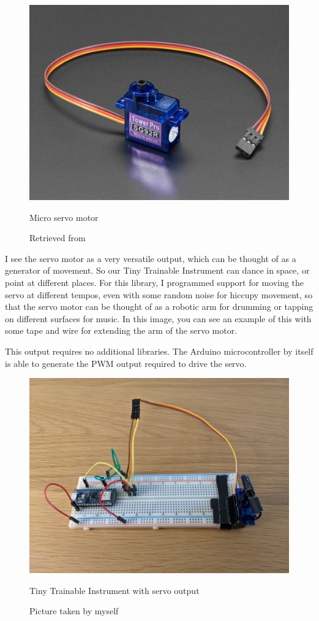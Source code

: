 \begin{figure}[ht]
  \centering
  \includegraphics[width=0.75\linewidth,height=0.25\textheight,keepaspectratio]{images/materials-adafruit-servo.jpg}
  \caption{Micro servo motor}
  \caption*{Retrieved from \cite{website-materials-adafruit-servo}}
  \label{fig:materials-adafruit-servo}
\end{figure}

I see the servo motor as a very versatile output, which can be thought of as a generator of movement. So our Tiny Trainable Instrument can dance in space, or point at different places. For this library, I programmed support for moving the servo at different tempos, even with some random noise for hiccupy movement, so that the servo motor can be thought of as a robotic arm for drumming or tapping on different surfaces for music. In this image, you can see an example of this with some tape and wire for extending the arm of the servo motor.

This output requires no additional libraries. The Arduino microcontroller by itself is able to generate the \acrfull{PWM} output required to drive the servo.

\begin{figure}[ht]
  \centering
  \includegraphics[width=0.75\linewidth,height=0.25\textheight,keepaspectratio]{images/output-servo.jpg}
  \caption{Tiny Trainable Instrument with servo output}
  \caption*{Picture taken by myself}
  \label{fig:output-servo}
\end{figure}

